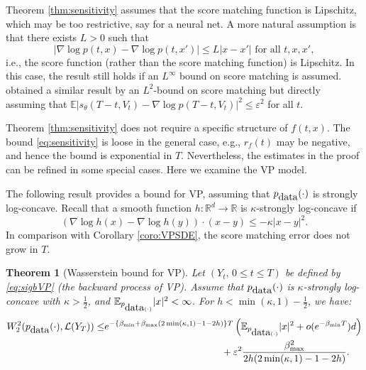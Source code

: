 \documentclass[letterpaper,11pt,reqno]{amsart}
\newtheorem{theorem}{Theorem}[section]
\numberwithin{equation}{section}
\begin{document}
\quad Theorem \ref{thm:sensitivity} assumes that the score matching function is Lipschitz,
which may be too restrictive, say for a neural net.
A more natural assumption is that there exists $L > 0$ such that 
$$|\nabla \log p (t,x) - \nabla \log p (t,x')| \le L |x-x'| \mbox{ for all } t,x,x',$$
i.e., the score function (rather than the score matching function) is Lipschitz. 
In this case, the result still holds if an $L^\infty$ bound on score matching is assumed.
\cite{GNZ23} obtained a similar result by 
an $L^2$-bound on score matching
but
directly assuming that 
$\mathbb{E}|s_\theta(T-t, V_t) - \nabla \log p(T-t, V_t)|^2 \le \varepsilon^2$ for all $t$.

\quad Theorem \ref{thm:sensitivity} does not require a specific structure of 
$f(t,x)$. 
The bound \eqref{eq:sensitivity} is loose in the general case, 
e.g.,
$r_f(t)$ may be negative, and hence the bound is exponential in $T$.
Nevertheless, 
the estimates in the proof can be refined in some special cases.
Here we examine the VP model.

\quad The following result provides a bound for VP, 
assuming that $p_{\tiny \mbox{data}}(\cdot)$ is strongly log-concave.
Recall that a smooth function $h: \mathbb{R}^d \to \mathbb{R}$ is $\kappa$-strongly log-concave if
\begin{equation}
(\nabla \log h(x) - \nabla \log h(y)) \cdot (x - y) \le -\kappa |x-y|^2.
\end{equation} 
In comparison with Corollary \ref{coro:VPSDE}, 
the score matching error does not grow in $T$.
\begin{theorem}[Wasserstein bound for VP]
\label{thm:VPW2}
Let $(Y_t, \, 0 \le t \le T)$ be defined by \eqref{eq:sigbVP} (the backward process of VP).
Assume that 
$p_{\tiny \mbox{data}}(\cdot)$ is $\kappa$-strongly log-concave with $\kappa > \frac{1}{2}$,
and $\mathbb{E}_{p_{\tiny \mbox{data}(\cdot)}}|x|^2 < \infty$.
For $h < \min(\kappa, 1) - \frac{1}{2}$, we have:
\begin{equation}
\label{eq:sensitivity2}
\begin{aligned}
W^2_2(p_{\tiny \mbox{data}}(\cdot), \mathcal{L}(Y_T)) \le & e^{- \{\beta_{\min} + \beta_{\max}( 2 \min(\kappa,1) - 1 -2h)\} T} 
 \left(\mathbb{E}_{p_{\tiny \mbox{data}(\cdot)}}|x|^2 
+ o(e^{-\beta_{\min} T})d \right) \\
&  \qquad \qquad \qquad \qquad \qquad \qquad + \varepsilon^2 \frac{\beta^2_{\max}}{2h(2 \min(\kappa, 1) - 1 -2h)}.
\end{aligned}
\end{equation}
\end{theorem}
\end{document}
